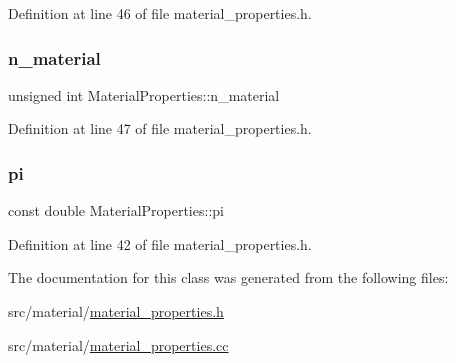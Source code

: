 Definition at line 46 of file material\+\_\+properties.\+h.

\mbox{\label{class_material_properties_a3bc9713ea94f32fb93d60f2a726e4f2d}} 
\subsubsection{\texorpdfstring{n\+\_\+material}{n\_material}}
{\footnotesize\ttfamily unsigned int Material\+Properties\+::n\+\_\+material\hspace{0.3cm}{\ttfamily [private]}}



Definition at line 47 of file material\+\_\+properties.\+h.

\mbox{\label{class_material_properties_a28173c461cf9a74c3b0ebe0f51c386d3}} 
\subsubsection{\texorpdfstring{pi}{pi}}
{\footnotesize\ttfamily const double Material\+Properties\+::pi\hspace{0.3cm}{\ttfamily [private]}}



Definition at line 42 of file material\+\_\+properties.\+h.



The documentation for this class was generated from the following files\+:\begin{DoxyCompactItemize}
\item 
src/material/\hyperlink{material__properties_8h}{material\+\_\+properties.\+h}\item 
src/material/\hyperlink{material__properties_8cc}{material\+\_\+properties.\+cc}\end{DoxyCompactItemize}
